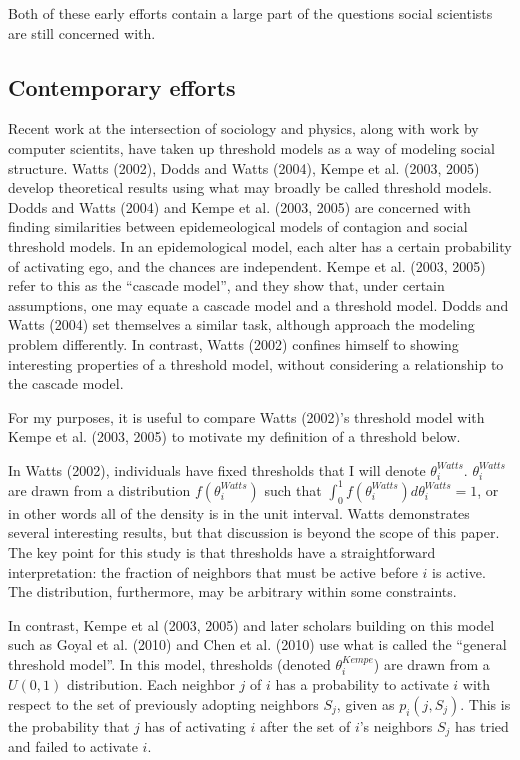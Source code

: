 \documentclass{article}
\begin{document}
Both of these early efforts contain a large part of the questions social scientists are still concerned with.

\subsection{Contemporary efforts}

Recent work at the intersection of sociology and physics, along with work by computer scientits, have taken up threshold models as a way of modeling social structure. Watts (2002), Dodds and Watts (2004), Kempe et al. (2003, 2005) develop theoretical results using what may broadly be called threshold models. Dodds and Watts (2004) and Kempe et al. (2003, 2005) are concerned with finding similarities between epidemeological models of contagion and social threshold models. In an epidemological model, each alter has a certain probability of activating ego, and the chances are independent. Kempe et al. (2003, 2005) refer to this as the ``cascade model'', and they show that, under certain assumptions, one may equate a cascade model and a threshold model. Dodds and Watts (2004) set themselves a similar task, although approach the modeling problem differently. In contrast, Watts (2002) confines himself to showing interesting properties of a threshold model, without considering a relationship to the cascade model.

For my purposes, it is useful to compare Watts (2002)'s threshold model with Kempe et al. (2003, 2005) to motivate my definition of a threshold below.

In Watts (2002), individuals have fixed thresholds that I will denote $\theta_i^{Watts}$. $\theta_i^{Watts}$ are drawn from a distribution $f(\theta_i^{Watts})$ such that $\int_0^1 f(\theta_i^{Watts})d\theta_i^{Watts} = 1$, or in other words all of the density is in the unit interval. Watts demonstrates several interesting results, but that discussion is beyond the scope of this paper. The key point for this study is that thresholds have a straightforward interpretation: the fraction of neighbors that must be active before $i$ is active. The distribution, furthermore, may be arbitrary within some constraints.

In contrast, Kempe et al (2003, 2005) and later scholars building on this model such as Goyal et al. (2010) and Chen et al. (2010) use what is called the ``general threshold model''. In this model, thresholds (denoted $\theta_i^{Kempe}$) are drawn from a $U(0,1)$ distribution. Each neighbor $j$ of $i$ has a probability to activate $i$ with respect to the set of previously adopting neighbors $S_j$, given as $p_i(j, S_j)$. This is the probability that $j$ has of activating $i$ after the set of $i$'s neighbors $S_j$ has tried and failed to activate $i$.
\end{document}
